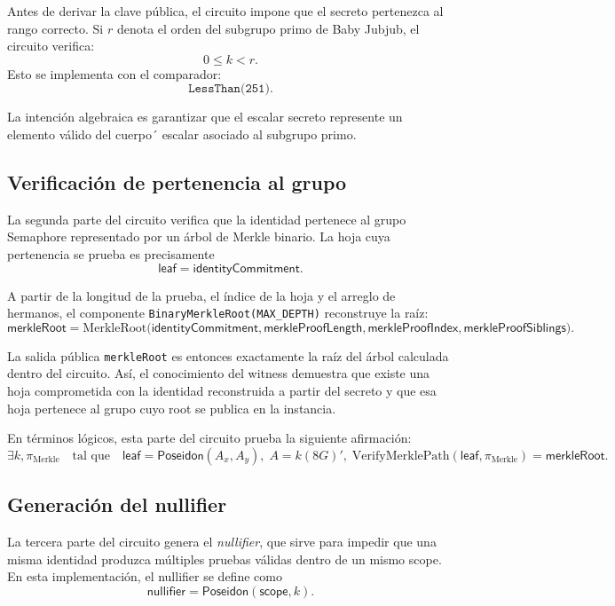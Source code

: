 \documentclass[11pt,a4paper]{article}
\begin{document}
	Antes de derivar la clave pública, el circuito impone que el secreto pertenezca al rango correcto. Si \(r\) denota el orden del subgrupo primo de Baby Jubjub, el circuito verifica:
	\[
	0 \le k < r.
	\]
	Esto se implementa con el comparador:
	\[
	\texttt{LessThan(251)}.
	\]
	
	La intención algebraica es garantizar que el escalar secreto represente un elemento válido del cuerpo´ escalar asociado al subgrupo primo.
	
	\subsection{Verificación de pertenencia al grupo}
	
	La segunda parte del circuito verifica que la identidad pertenece al grupo Semaphore representado por un árbol de Merkle binario. La hoja cuya pertenencia se prueba es precisamente
	\[
	\mathsf{leaf} = \mathsf{identityCommitment}.
	\]
	
	A partir de la longitud de la prueba, el índice de la hoja y el arreglo de hermanos, el componente \texttt{BinaryMerkleRoot(MAX\_DEPTH)} reconstruye la raíz:
	\[
	\mathsf{merkleRoot} =
	\mathrm{MerkleRoot}\bigl(\mathsf{identityCommitment}, \mathsf{merkleProofLength}, \mathsf{merkleProofIndex}, \mathsf{merkleProofSiblings}\bigr).
	\]
	
	La salida pública \texttt{merkleRoot} es entonces exactamente la raíz del árbol calculada dentro del circuito. Así, el conocimiento del witness demuestra que existe una hoja comprometida con la identidad reconstruida a partir del secreto y que esa hoja pertenece al grupo cuyo root se publica en la instancia.
	
	En términos lógicos, esta parte del circuito prueba la siguiente afirmación:
	\[
	\exists k,\pi_{\mathrm{Merkle}}
	\quad\text{tal que}\quad
	\mathsf{leaf}=\mathsf{Poseidon}(A_x,A_y),\;
	A=k(8G)',\;
	\mathrm{VerifyMerklePath}(\mathsf{leaf},\pi_{\mathrm{Merkle}})=\mathsf{merkleRoot}.
	\]
	
	\subsection{Generación del nullifier}
	
	La tercera parte del circuito genera el \emph{nullifier}, que sirve para impedir que una misma identidad produzca múltiples pruebas válidas dentro de un mismo scope. En esta implementación, el nullifier se define como
	\[
	\mathsf{nullifier} = \mathsf{Poseidon}(\mathsf{scope}, k).
	\]
	
\end{document}

